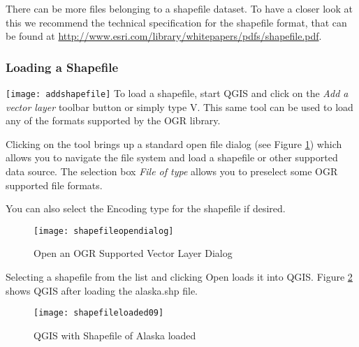 There can be more files belonging to a shapefile dataset.
To have a closer look at this we recommend the technical specification for the shapefile format,
that can be found at \url{http://www.esri.com/library/whitepapers/pdfs/shapefile.pdf}.

\subsubsection{Loading a Shapefile}\label{sec:load_shapefile}
{\texttt{[image: addshapefile]}} To load a shapefile, start
QGIS and click on the \textit{Add a vector layer}
toolbar button or simply type V. This same tool can be used to
load any of the formats supported by the OGR library.

Clicking on the tool brings up a standard open file dialog (see Figure
\ref{fig:openshapefile}) which allows you to navigate the file system and load
a shapefile or other supported data source. 
The selection box \textsl{File of type} allows you to preselect some OGR supported file formats.

You can also select the Encoding type for the shapefile if desired.

\begin{figure}[h]
   \begin{center}
   \caption{Open an OGR Supported Vector Layer Dialog}\label{fig:openshapefile}\smallskip
   \texttt{[image: shapefileopendialog]}
\end{center} 
\end{figure}

Selecting a shapefile from the list and clicking Open loads it into QGIS. Figure
\ref{fig:loadedshapefile} shows QGIS after loading the alaska.shp file.

\begin{figure}[ht]
   \begin{center}
   \caption{QGIS with Shapefile of Alaska loaded}\label{fig:loadedshapefile}\smallskip
   \texttt{[image: shapefileloaded09]}
\end{center} 
\end{figure}

\begin{Tip}\caption{\textsc{Layer Colors}}
\end{Tip}

